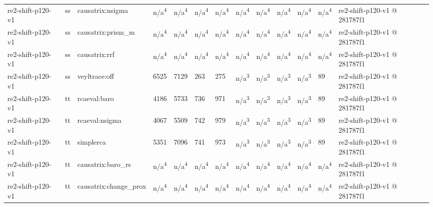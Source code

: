 \begin{table}[t]
\begin{tabular}{lllllllllllll}
re2-shift-p120-v1 & ss & causatrix:nsigma & n/a\textsuperscript{4} & n/a\textsuperscript{4} & n/a\textsuperscript{4} & n/a\textsuperscript{4} & n/a\textsuperscript{4} & n/a\textsuperscript{4} & n/a\textsuperscript{4} & n/a\textsuperscript{4} & n/a\textsuperscript{4} & re2-shift-p120-v1 @ 281787f1 \\
re2-shift-p120-v1 & ss & causatrix:prism\_m & n/a\textsuperscript{4} & n/a\textsuperscript{4} & n/a\textsuperscript{4} & n/a\textsuperscript{4} & n/a\textsuperscript{4} & n/a\textsuperscript{4} & n/a\textsuperscript{4} & n/a\textsuperscript{4} & n/a\textsuperscript{4} & re2-shift-p120-v1 @ 281787f1 \\
re2-shift-p120-v1 & ss & causatrix:rrf & n/a\textsuperscript{4} & n/a\textsuperscript{4} & n/a\textsuperscript{4} & n/a\textsuperscript{4} & n/a\textsuperscript{4} & n/a\textsuperscript{4} & n/a\textsuperscript{4} & n/a\textsuperscript{4} & n/a\textsuperscript{4} & re2-shift-p120-v1 @ 281787f1 \\
re2-shift-p120-v1 & ss & veyltrace:off & 6525 & 7129 & 263 & 275 & n/a\textsuperscript{3} & n/a\textsuperscript{3} & n/a\textsuperscript{3} & n/a\textsuperscript{3} & 89 & re2-shift-p120-v1 @ 281787f1 \\
re2-shift-p120-v1 & tt & rcaeval:baro & 4186 & 5733 & 736 & 971 & n/a\textsuperscript{3} & n/a\textsuperscript{3} & n/a\textsuperscript{3} & n/a\textsuperscript{3} & 89 & re2-shift-p120-v1 @ 281787f1 \\
re2-shift-p120-v1 & tt & rcaeval:nsigma & 4067 & 5509 & 742 & 979 & n/a\textsuperscript{3} & n/a\textsuperscript{3} & n/a\textsuperscript{3} & n/a\textsuperscript{3} & 89 & re2-shift-p120-v1 @ 281787f1 \\
re2-shift-p120-v1 & tt & simplerca & 5351 & 7096 & 741 & 973 & n/a\textsuperscript{3} & n/a\textsuperscript{3} & n/a\textsuperscript{3} & n/a\textsuperscript{3} & 89 & re2-shift-p120-v1 @ 281787f1 \\
re2-shift-p120-v1 & tt & causatrix:baro\_rs & n/a\textsuperscript{4} & n/a\textsuperscript{4} & n/a\textsuperscript{4} & n/a\textsuperscript{4} & n/a\textsuperscript{4} & n/a\textsuperscript{4} & n/a\textsuperscript{4} & n/a\textsuperscript{4} & n/a\textsuperscript{4} & re2-shift-p120-v1 @ 281787f1 \\
re2-shift-p120-v1 & tt & causatrix:change\_prox & n/a\textsuperscript{4} & n/a\textsuperscript{4} & n/a\textsuperscript{4} & n/a\textsuperscript{4} & n/a\textsuperscript{4} & n/a\textsuperscript{4} & n/a\textsuperscript{4} & n/a\textsuperscript{4} & n/a\textsuperscript{4} & re2-shift-p120-v1 @ 281787f1 \\

\end{tabular}
\end{table}
